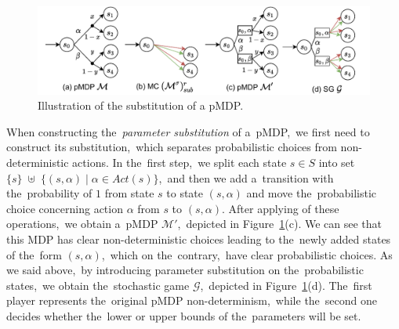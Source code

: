 \begin{figure}[h!]
\centering
\includegraphics[width=1.0\textwidth]{figures/mdp_sub.pdf}
\caption{Illustration of the substitution of a pMDP.}%
\label{fig:sub_mdp}%
\end{figure}
\noindent
When constructing the~\textit{parameter substitution} of a~pMDP,~we first need to construct its substitution,~which separates probabilistic choices from non-deterministic actions.
In the~first step,~we split each state $s \in S$ into set $\{s \} \; \uplus \; \{ (s, \alpha) \; \lvert \; \alpha \in Act(s) \}$,~and then we add a~transition with the~probability of $1$ from state $s$ to state $(s, \alpha)$ and move the~probabilistic choice concerning action $\alpha$ from $s$ to $(s, \alpha)$.
After applying of these operations,~we obtain a~pMDP $\mathcal{M}'$,~depicted in Figure~\ref{fig:sub_mdp}(c).
We can see that this MDP has clear non-deterministic choices leading to the~newly added states of the~form $(s, \alpha)$,~which on the~contrary,~have clear probabilistic choices.
As we said above,~by introducing parameter substitution on the~probabilistic states,~we obtain the~stochastic game $\mathcal{G}$,~depicted in Figure~\ref{fig:sub_mdp}(d).
The~first player represents the~original pMDP non-determinism,~while the~second one decides whether the~lower or upper bounds of the~parameters will be set.

